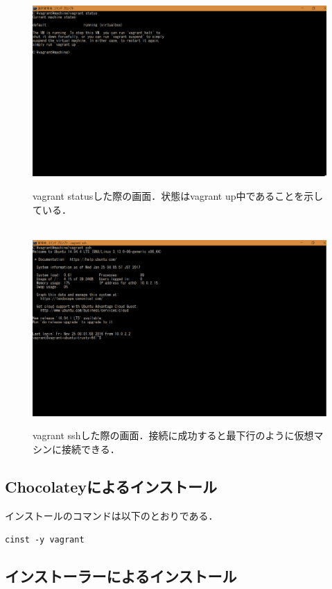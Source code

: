 \begin{figure}[htbp]
\centering　
\includegraphics[width=13cm]{vagrantstatus.png}
\caption{vagrant statusした際の画面．状態はvagrant up中であることを示している．}
\end{figure}

\begin{figure}[htbp]
\centering　
\includegraphics[width=13cm]{vagrantssh.png}
\caption{vagrant sshした際の画面．接続に成功すると最下行のように仮想マシンに接続できる．}
\end{figure}

\subsection{Chocolateyによるインストール}

インストールのコマンドは以下のとおりである．

\texttt{cinst -y vagrant}


\subsection{インストーラーによるインストール}

